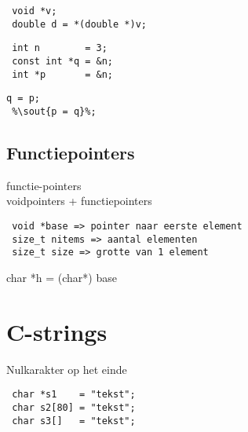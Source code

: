 \documentclass[12pt]{report}
\begin{document}
\begin{lstlisting}
 void *v;
 double d = *(double *)v;
\end{lstlisting}

\begin{lstlisting}
 int n        = 3;
 const int *q = &n;
 int *p       = &n;
\end{lstlisting}


\begin{lstlisting}[escapechar=\%]
 q = p; 
 %\sout{p = q}%;
\end{lstlisting}

\section{Functiepointers}
functie-pointers\\
voidpointers + functiepointers

\begin{lstlisting}
 void *base => pointer naar eerste element
 size_t nitems => aantal elementen
 size_t size => grotte van 1 element
\end{lstlisting}
char *h = (char*) base

\chapter{C-strings}
Nulkarakter op het einde\\
\begin{lstlisting}
 char *s1    = "tekst";
 char s2[80] = "tekst";
 char s3[]   = "tekst";
\end{lstlisting}
\end{document}

